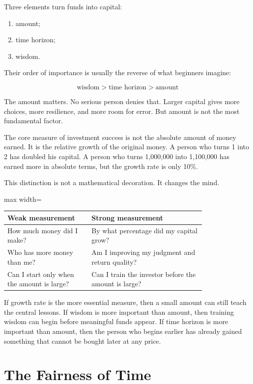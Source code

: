 Three elements turn funds into capital:

\begin{enumerate}
\item amount;
\item time horizon;
\item wisdom.
\end{enumerate}

Their order of importance is usually the reverse of what beginners imagine:

\[
\text{wisdom} > \text{time horizon} > \text{amount}
\]

The amount matters. No serious person denies that. Larger capital gives more choices, more resilience, and more room for error. But amount is not the most fundamental factor.

The core measure of investment success is not the absolute amount of money earned. It is the relative growth of the original money. A person who turns 1 into 2 has doubled his capital. A person who turns 1,000,000 into 1,100,000 has earned more in absolute terms, but the growth rate is only 10\%.

This distinction is not a mathematical decoration. It changes the mind.

\begin{center}
\begin{adjustbox}{max width=\linewidth}
\begin{tabular}{p{0.34\linewidth}p{0.46\linewidth}}
\hline
Weak measurement & Strong measurement \\
\hline
How much money did I make? & By what percentage did my capital grow? \\
Who has more money than me? & Am I improving my judgment and return quality? \\
Can I start only when the amount is large? & Can I train the investor before the amount is large? \\
\hline
\end{tabular}
\end{adjustbox}
\end{center}

If growth rate is the more essential measure, then a small amount can still teach the central lessons. If wisdom is more important than amount, then training wisdom can begin before meaningful funds appear. If time horizon is more important than amount, then the person who begins earlier has already gained something that cannot be bought later at any price.

\section*{The Fairness of Time}

